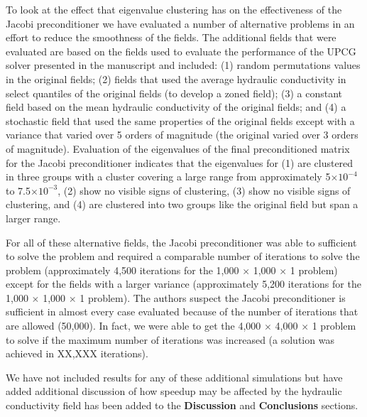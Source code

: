 \documentclass[12pt]{article} %
\begin{document}
\begin{enumerate}
To look at the effect that eigenvalue clustering has on the effectiveness of the Jacobi preconditioner we have evaluated a number of alternative problems in an effort to reduce the smoothness of the fields. The additional fields that were evaluated are based on the fields used to evaluate the performance of the UPCG solver presented in the manuscript and included: (1) random permutations values in the original fields; (2) fields that used the average hydraulic conductivity in select quantiles of the original fields (to develop a zoned field); (3) a constant field based on the mean hydraulic conductivity of the original fields; and (4) a stochastic field that used the same properties of the original fields except with a variance that varied over 5 orders of magnitude (the original varied over 3 orders of magnitude).  Evaluation of the eigenvalues of the final preconditioned matrix for the Jacobi preconditioner indicates that the eigenvalues for (1) are clustered in three groups with a cluster covering a large range from approximately 5$\times 10^{-4}$ to 7.5$\times 10^{-3}$, (2) show no visible signs of clustering, (3) show no visible signs of clustering, and (4) are clustered into two groups like the original field but span a larger range.

For all of these alternative fields, the Jacobi preconditioner was able to sufficient to solve the problem and required a comparable number of iterations to solve the problem (approximately 4,500 iterations for the 1,000 $\times$ 1,000 $\times$ 1 problem) except for the fields with a larger variance (approximately 5,200 iterations for the 1,000 $\times$ 1,000 $\times$ 1 problem). The authors suspect the Jacobi preconditioner is sufficient in almost every case evaluated because of the number of iterations that are allowed (50,000). In fact, we were able to get the 4,000 $\times$ 4,000 $\times$ 1 problem to solve if the maximum number of iterations was increased (a solution was achieved in XX,XXX iterations).

We have not included results for any of these additional simulations but have added additional discussion of how speedup may be affected by the hydraulic conductivity field has been added to the \textbf{Discussion} and \textbf{Conclusions} sections.


\end{enumerate}
\end{document}

